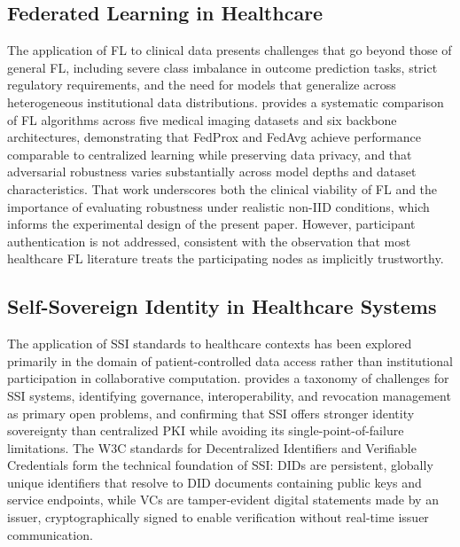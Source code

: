 \documentclass{sbc2023}
\begin{document}
\subsection{Federated Learning in Healthcare}

The application of FL to clinical data presents challenges that go beyond those of general FL, including severe class imbalance in outcome prediction tasks, strict regulatory requirements, and the need for models that generalize across heterogeneous institutional data distributions. \citet{chaddad2026systematic} provides a systematic comparison of FL algorithms across five medical imaging datasets and six backbone architectures, demonstrating that FedProx and FedAvg achieve performance comparable to centralized learning while preserving data privacy, and that adversarial robustness varies substantially across model depths and dataset characteristics. That work underscores both the clinical viability of FL and the importance of evaluating robustness under realistic non-IID conditions, which informs the experimental design of the present paper. However, participant authentication is not addressed, consistent with the observation that most healthcare FL literature treats the participating nodes as implicitly trustworthy.

\subsection{Self-Sovereign Identity in Healthcare Systems}

The application of SSI standards to healthcare contexts has been explored primarily in the domain of patient-controlled data access rather than institutional participation in collaborative computation. \citet{kubach2024taxonomy} provides a taxonomy of challenges for SSI systems, identifying governance, interoperability, and revocation management as primary open problems, and confirming that SSI offers stronger identity sovereignty than centralized PKI while avoiding its single-point-of-failure limitations. The W3C standards for Decentralized Identifiers \citep{W3C_DID_2022} and Verifiable Credentials \citep{W3C2019} form the technical foundation of SSI: DIDs are persistent, globally unique identifiers that resolve to DID documents containing public keys and service endpoints, while VCs are tamper-evident digital statements made by an issuer, cryptographically signed to enable verification without real-time issuer communication.
\end{document}
